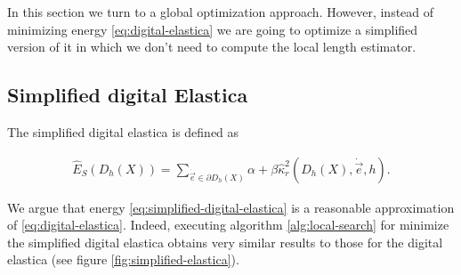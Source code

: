 In this section we turn to a global optimization approach. However, instead of minimizing energy \eqref{eq:digital-elastica} we are going to optimize a simplified version of it in which we don't need to compute the local length estimator.

\subsection{Simplified digital Elastica}
\label{ch6:subsec:simplified-digital-elastica}

The simplified digital elastica is defined as

	\begin{align}
	\hat{E}_S( D_h(X) ) = \sum_{\dot{\vec{e}} \in \partial D_h(X)}{ \alpha + \beta \hat{\kappa}_{r}^2(D_h(X),\dot{\vec{e}},h) }.
	\label{eq:simplified-digital-elastica}
	\end{align}
	

We argue that energy \eqref{eq:simplified-digital-elastica} is a reasonable approximation of \eqref{eq:digital-elastica}. Indeed, executing algorithm \ref{alg:local-search} for minimize the simplified digital elastica obtains very similar results to those for the digital elastica (see figure \ref{fig:simplified-elastica}).


